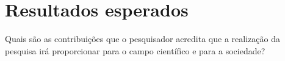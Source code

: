 
\chapter{Resultados esperados}

Quais são as contribuições que o pesquisador acredita que a realização da
pesquisa irá proporcionar para o campo científico e para a sociedade?

